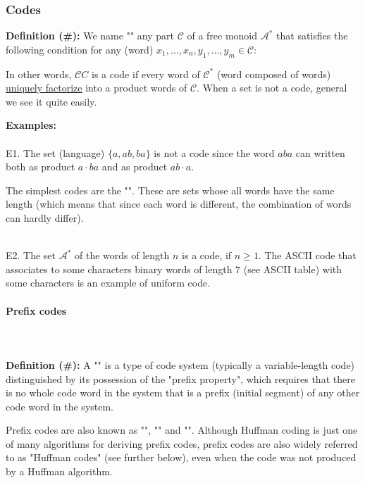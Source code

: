 	
	\subsubsection{Codes}
	\textbf{Definition (\#\mydef):} We name "" any part $\mathcal{C}$ of a free monoid $\mathcal{A}^{*}$ that satisfies the following condition for any (word) $x_1,\ldots,x_n,y_1,\ldots,y_m\in \mathcal{C}$:
	
	In other words, $\mathcal{C}C$ is a code if every word of $\mathcal{C}^{*}$ (word composed of words) \underline{uniquely factorize} into a product words of $\mathcal{C}$. When a set is not a code, general we see it quite easily.
	\begin{tcolorbox}[colframe=black,colback=white,sharp corners]
	\textbf{{\Large {}}Examples:}\\\\	
	E1. The set (language) $\{a,ab,ba\}$ is not a code since the word $aba$ can written both as product $a\cdot ba$ and as product $ab\cdot a$.\\
	\begin{tcolorbox}[title=Remark,colframe=black,arc=10pt]
	The simplest codes are the "". These are sets whose all words have the same length (which means that since each word is different, the combination of words can hardly differ).
	\end{tcolorbox}
	\phantom \\
	E2. The set $\mathcal{A}^{*}$ of the words of length $n$ is a code, if $n\ge 1$. The ASCII code that associates to some characters binary words of length $7$ (see ASCII table) with some characters is an example of uniform code.
	\end{tcolorbox}
	
	\pagebreak
	\paragraph{Prefix codes}\mbox{}\\\\
	\textbf{Definition (\#\mydef):} A "" is a type of code system (typically a variable-length code) distinguished by its possession of the "prefix property", which requires that there is no whole code word in the system that is a prefix (initial segment) of any other code word in the system. 
	
	Prefix codes are also known as "", "" and "". Although Huffman coding is just one of many algorithms for deriving prefix codes, prefix codes are also widely referred to as "Huffman codes" (see further below), even when the code was not produced by a Huffman algorithm. 
	
